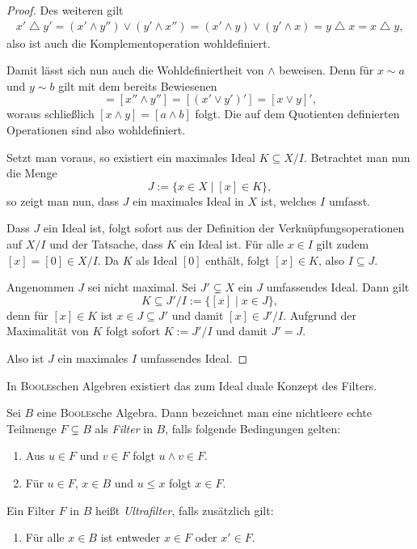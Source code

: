 \begin{proof}
  Des weiteren gilt
  \begin{align*}
    x' \bigtriangleup y'
    = (x' \land y'') \lor (y' \land x'')
    = (x' \land y) \lor (y' \land x)
    = y \bigtriangleup x
    = x \bigtriangleup y,
  \end{align*}
  also ist auch die Komplementoperation wohldefiniert.

  Damit lässt sich nun auch die Wohldefiniertheit von $\land$ beweisen.
  Denn für $x \sim a$ und $y \sim b$ gilt mit dem bereits Bewiesenen
  \begin{displaymath}
    [x \land y]
    = [x'' \land y'']
    = [(x' \lor y')']
    = [x \lor y]',
  \end{displaymath}
  woraus schließlich $[x \land y] = [a \land b]$ folgt.
  Die auf dem Quotienten definierten Operationen sind also wohldefiniert.

  Setzt man \PIT voraus, so existiert ein maximales Ideal $K \subseteq X/I$.
  Betrachtet man nun die Menge
  \begin{displaymath}
    J := \{x \in X \mid [x] \in K\},
  \end{displaymath}
  so zeigt man nun, dass $J$ ein maximales Ideal in $X$ ist, welches $I$ umfasst.
  
  Dass $J$ ein Ideal ist, folgt sofort aus der Definition der Verknüpfungsoperationen auf $X/I$ und der Tatsache, dass $K$ ein Ideal ist.
  Für alle $x \in I$ gilt zudem $[x] = [0] \in X/I$. 
  Da $K$ als Ideal $[0]$ enthält, folgt $[x] \in K$, also $I \subseteq J$.
  
  Angenommen $J$ sei nicht maximal. Sei $J' \subsetneq X$ ein $J$ umfassendes Ideal.
  Dann gilt 
  \begin{displaymath}
    K \subseteq J'/I := \{[x] \mid x \in J\},
  \end{displaymath}
  denn für $[x] \in K$ ist $x \in J \subseteq J'$ und damit $[x] \in J'/I$.
  Aufgrund der Maximalität von $K$ folgt sofort $K := J'/I$ und damit $J' = J$.

  Also ist $J$ ein maximales $I$ umfassendes Ideal.
\end{proof}

In \textsc{Boole}schen Algebren existiert das zum Ideal duale Konzept des Filters. 

\begin{defn}
  Sei $B$ eine \textsc{Boole}sche Algebra. Dann bezeichnet man eine nichtleere echte Teilmenge $F \subsetneq B$ als \textit{Filter} in $B$, falls folgende Bedingungen gelten:
  \begin{enumerate}[(1)]
    \item Aus $u \in F$ und $v \in F$ folgt $u \land v \in F$.
    \item Für $u \in F$, $x \in B$ und $u \leq x$ folgt  $x \in F$.
  \end{enumerate}
  Ein Filter $F$ in $B$ heißt \textit{Ultrafilter}, falls zusätzlich gilt:
  \begin{enumerate}[(3)]
    \item Für alle $x \in B$ ist entweder $x \in F$ oder $x' \in F$.
  \end{enumerate}
\end{defn}


